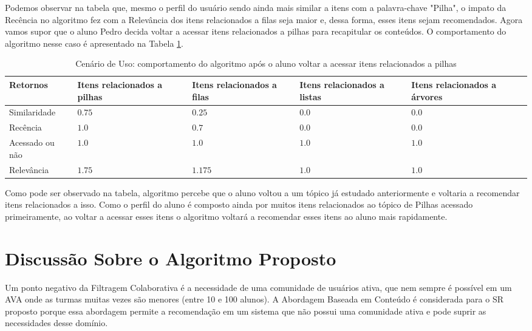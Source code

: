 Podemos observar na tabela que, mesmo o perfil do usuário sendo ainda mais similar a itens com a palavra-chave "Pilha",
o impato da Recência no algoritmo fez com a Relevância dos itens relacionados a filas seja maior e, dessa forma, esses
itens sejam recomendados. Agora vamos supor que o aluno Pedro decida voltar a acessar itens relacionados a pilhas para
recapitular os conteúdos. O comportamento do algoritmo nesse caso é apresentado na Tabela \ref{tab:cenario-de-uso-3}.

\begin{table}[hp]
\footnotesize
\caption[Cenário de Uso: comportamento do algoritmo após o aluno voltar a acessar itens relacionados a pilhas]{Cenário de Uso: comportamento do algoritmo após o aluno voltar a acessar itens relacionados a pilhas}
\label{tab:cenario-de-uso-3}
\centering
\begin{tabular}{|p{2cm}|p{3cm}|p{3cm}|p{3cm}|p{3cm}|}
  \hline
  \textbf{Retornos} & \textbf{Itens relacionados a pilhas} & \textbf{Itens relacionados a filas} & \textbf{Itens relacionados a listas} & \textbf{Itens relacionados a árvores} \\
  \hline
  Similaridade & $0.75$ & $0.25$ & $0.0$ & $0.0$ \\
  \hline
  Recência & $1.0$ & $0.7$ & $0.0$ & $0.0$ \\
  \hline
  Acessado ou não & $1.0$ & $1.0$ & $1.0$ & $1.0$ \\
  \hline
  Relevância & $1.75$ & $1.175$ & $1.0$ & $1.0$ \\
  \hline
\end{tabular}
\end{table}

Como pode ser observado na tabela, algoritmo percebe que o aluno voltou a um tópico já estudado anteriormente e
voltaria a recomendar itens relacionados a isso. Como o perfil do aluno é composto ainda por muitos itens relacionados ao tópico
de Pilhas acessado primeiramente, ao voltar a acessar esses itens o algoritmo voltará a recomendar esses itens
ao aluno mais rapidamente.

\section{Discussão Sobre o Algoritmo Proposto}

Um ponto negativo da Filtragem Colaborativa é a necessidade de uma comunidade de usuários ativa, que nem sempre é
possível em um AVA onde as turmas muitas vezes são menores (entre 10 e 100 alunos). A Abordagem Baseada
em Conteúdo é considerada para o SR proposto porque essa abordagem permite a recomendação em um sistema que não possui uma
comunidade ativa e pode suprir as necessidades desse domínio.


